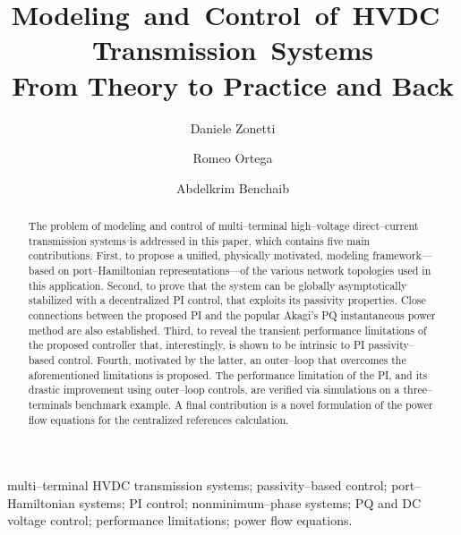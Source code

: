 \documentclass[5p,twocolumn]{elsarticle}
\numberwithin{equation}{section}
\begin{document}
\title{\mbox{Modeling and Control of HVDC Transmission Systems}\\{From Theory to Practice and Back}}


\author[lss]{Daniele Zonetti}
\author[lss]{Romeo Ortega}
\author[als]{Abdelkrim Benchaib}

 \address[lss]{Laboratoire des Signaux et Syst\`{e}mes de Centrale Sup\'{e}lec, 3, rue Joliot Curie - 91192, Gif-sur-Yvette, France}
\address[als]{ Alstom Grid, 102, avenue de Paris - 91300 Massy, France}




\begin{abstract} 
The problem of modeling and control of multi--terminal high--voltage direct--current transmission systems is addressed in this paper, which contains five main contributions. First, to
propose a unified, physically motivated, modeling framework---based on port--Hamiltonian representations---of the various  network topologies used in this application. Second, to prove that the system
can be globally asymptotically stabilized with a decentralized PI control, that exploits its passivity properties. Close connections between the proposed PI and the popular Akagi's PQ instantaneous power method
are also established. Third, to reveal the transient performance limitations of the proposed controller that, interestingly, is shown to be intrinsic to PI passivity--based control. Fourth, motivated by the latter, an outer--loop that overcomes the aforementioned limitations is proposed. The performance limitation of the PI, and its drastic improvement using outer--loop controls, are verified via simulations on a three--terminals benchmark example. A final contribution is a novel formulation of the power flow equations for the centralized references calculation.
\end{abstract}

\begin{keyword}
multi--terminal HVDC transmission systems; passivity--based control; port--Hamiltonian systems; PI control;  nonminimum--phase systems; PQ and DC voltage control; performance limitations; power flow equations.
\end{keyword}








\maketitle
\end{document}
